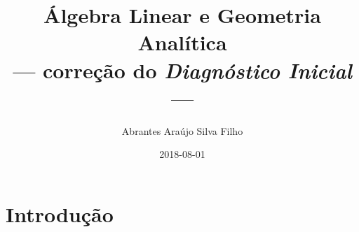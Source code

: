 \documentclass[pdftex, brazil, 12pt, oneside]{article}
\begin{document}
\title{Álgebra Linear e Geometria Analítica\\
--- correção do \emph{Diagnóstico Inicial} ---}
\author{Abrantes Araújo Silva Filho}
\date{2018-08-01}
\maketitle


\section{Introdução}
\label{intro}
\end{document}

